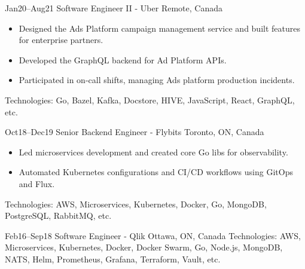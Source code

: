\documentclass[]{cv-style}                     %
\begin{document}
\begin{entrylist}
  \entry
  {\small Jan20--Aug21}
  {Software Engineer II - Uber}
  {Remote, Canada}
  {
    \begin{itemize}
      \item Designed the Ads Platform campaign management service and built features for enterprise partners.
      \item Developed the GraphQL backend for Ad Platform APIs.
      \item Participated in on-call shifts, managing Ads platform production incidents.
    \end{itemize}
    Technologies: Go, Bazel, Kafka, Docstore, HIVE, JavaScript, React, GraphQL, etc.
  }

  \entry
  {\small Oct18--Dec19}
  {Senior Backend Engineer - Flybits}
  {Toronto, ON, Canada}
  {
    \begin{itemize}
      \item Led microservices development and created core Go libs for observability.
      \item Automated Kubernetes configurations and CI/CD workflows using GitOps and Flux.
    \end{itemize}
    Technologies: AWS, Microservices, Kubernetes, Docker, Go, MongoDB, PostgreSQL, RabbitMQ, etc.
  }

  \entry
  {\small Feb16--Sep18}
  {Software Engineer - Qlik}
  {Ottawa, ON, Canada}
  {
    Technologies: AWS, Microservices, Kubernetes, Docker, Docker Swarm, Go, Node.js, MongoDB, NATS, Helm, Prometheus, Grafana, Terraform, Vault, etc.
   }


\end{entrylist}
\end{document}
